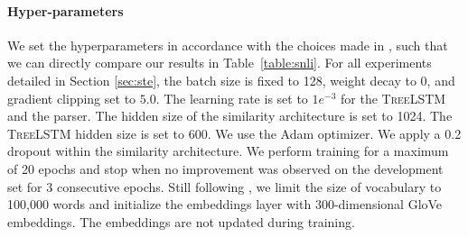 


\paragraph{Hyper-parameters} We set the hyperparameters in accordance with the choices made in \textcite{choi_18}, such that we can directly compare our results in Table~\ref{table:snli}. For all experiments detailed in Section \ref{sec:ste}, the batch size is fixed to 128, weight decay to $0$, and gradient clipping set to $5.0$. The learning rate is set to $1e^{-3}$ for the \textsc{TreeLSTM} and the parser. The hidden size of the similarity architecture is set to 1024. The \textsc{TreeLSTM} hidden size is set to 600. We use the Adam optimizer. We apply a 0.2 dropout within the similarity architecture. We perform training for a maximum of 20 epochs and stop when no improvement was observed on the development set for 3 consecutive epochs. Still following \textcite{choi_18}, we limit the size of vocabulary to 100,000 words and initialize the embeddings layer with 300-dimensional GloVe embeddings. The embeddings are not updated during training. %

